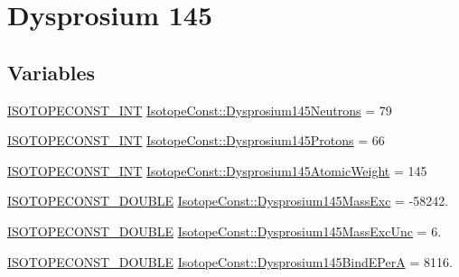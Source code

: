 \hypertarget{group___isotope_const-_dysprosium-_dy145}{}\section{Dysprosium 145}
\label{group___isotope_const-_dysprosium-_dy145}
\subsection*{Variables}
\begin{DoxyCompactItemize}
\item 
\mbox{\hyperlink{group___isotope_const-_macros_ga5f18360b3e99483a35c32d789e62621c}{I\+S\+O\+T\+O\+P\+E\+C\+O\+N\+S\+T\+\_\+\+I\+NT}} \mbox{\hyperlink{group___isotope_const-_dysprosium-_dy145_gab0358176a9a23dc3bf148371a5fa8267}{Isotope\+Const\+::\+Dysprosium145\+Neutrons}} = 79
\item 
\mbox{\hyperlink{group___isotope_const-_macros_ga5f18360b3e99483a35c32d789e62621c}{I\+S\+O\+T\+O\+P\+E\+C\+O\+N\+S\+T\+\_\+\+I\+NT}} \mbox{\hyperlink{group___isotope_const-_dysprosium-_dy145_ga84d9af1997836961a33e5bc4805e3dd1}{Isotope\+Const\+::\+Dysprosium145\+Protons}} = 66
\item 
\mbox{\hyperlink{group___isotope_const-_macros_ga5f18360b3e99483a35c32d789e62621c}{I\+S\+O\+T\+O\+P\+E\+C\+O\+N\+S\+T\+\_\+\+I\+NT}} \mbox{\hyperlink{group___isotope_const-_dysprosium-_dy145_gafa8be76ff3fc895c863071fe460fb34b}{Isotope\+Const\+::\+Dysprosium145\+Atomic\+Weight}} = 145
\item 
\mbox{\hyperlink{group___isotope_const-_macros_ga8f45a7272ce02c0b4c65c44636ed719a}{I\+S\+O\+T\+O\+P\+E\+C\+O\+N\+S\+T\+\_\+\+D\+O\+U\+B\+LE}} \mbox{\hyperlink{group___isotope_const-_dysprosium-_dy145_ga5fa0e72dc68f884044840f5c3649cfb6}{Isotope\+Const\+::\+Dysprosium145\+Mass\+Exc}} = -\/58242.
\item 
\mbox{\hyperlink{group___isotope_const-_macros_ga8f45a7272ce02c0b4c65c44636ed719a}{I\+S\+O\+T\+O\+P\+E\+C\+O\+N\+S\+T\+\_\+\+D\+O\+U\+B\+LE}} \mbox{\hyperlink{group___isotope_const-_dysprosium-_dy145_ga611a9e12988efeb985a3c710b0c20042}{Isotope\+Const\+::\+Dysprosium145\+Mass\+Exc\+Unc}} = 6.
\item 
\mbox{\hyperlink{group___isotope_const-_macros_ga8f45a7272ce02c0b4c65c44636ed719a}{I\+S\+O\+T\+O\+P\+E\+C\+O\+N\+S\+T\+\_\+\+D\+O\+U\+B\+LE}} \mbox{\hyperlink{group___isotope_const-_dysprosium-_dy145_gab99f72bac4df8c8c514ee3ce50171f7d}{Isotope\+Const\+::\+Dysprosium145\+Bind\+E\+PerA}} = 8116.
\item 

\end{DoxyCompactItemize}
